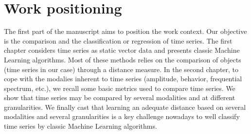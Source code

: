 \part{Work positioning}

The first part of the manuscript aims to position the work context. Our objective is the comparison and the classification or regression of time series. The first chapter considers time series as static vector data and presents classic Machine Learning algorithms. Most of these methods relies on the comparison of objects (time series in our case) through a distance measure. In the second chapter, to cope with the modalies inherent to time series (amplitude, behavior, frequential spectrum, etc.), we recall some basic metrics used to compare time series. We show that time series may be compared by several modalities and at different granularities. We finally cast that learning an adequate distance based on several modalities and several granularities is a key challenge nowadays to well classify time series by classic Machine Learning algorithms.

